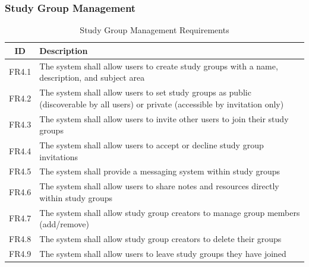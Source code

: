 \documentclass{article}
\begin{document}
\subsubsection{Study Group Management}
\begin{table}[h!]
\centering
\begin{tabular}{|c|p{10cm}|}
\hline
\textbf{ID} & \textbf{Description} \\
\hline
FR4.1 & The system shall allow users to create study groups with a name, description, and subject area \\
FR4.2 & The system shall allow users to set study groups as public (discoverable by all users) or private (accessible by invitation only) \\
FR4.3 & The system shall allow users to invite other users to join their study groups \\
FR4.4 & The system shall allow users to accept or decline study group invitations \\
FR4.5 & The system shall provide a messaging system within study groups \\
FR4.6 & The system shall allow users to share notes and resources directly within study groups \\
FR4.7 & The system shall allow study group creators to manage group members (add/remove) \\
FR4.8 & The system shall allow study group creators to delete their groups \\
FR4.9 & The system shall allow users to leave study groups they have joined \\
\hline
\end{tabular}
\caption{Study Group Management Requirements}
\label{tab: study_group_management}
\end{table}

\clearpage
\end{document}
